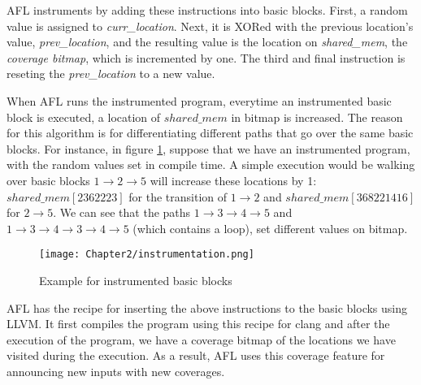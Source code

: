 AFL instruments by adding these instructions into basic blocks. First, a random value is assigned to \textit{curr\_location}. Next, it is XORed with the previous location's value, \textit{prev\_location}, and the resulting value is the location on \textit{shared\_mem}, the \textit{coverage bitmap}, which is incremented by one. The third and final instruction is reseting the \textit{prev\_location} to a new value.

When AFL runs the instrumented program, everytime an instrumented basic block is executed, a location of $shared\_mem$ in bitmap is increased. The reason for this algorithm is for differentiating different paths that go over the same basic blocks. For instance, in figure \ref{fig:instrumentation}, suppose that we have an instrumented program, with the random values set in compile time. A simple execution would be walking over basic blocks $1\rightarrow2\rightarrow5$ will increase these locations by 1: $shared\_mem[2362223]$ for the transition of $1\rightarrow2$ and $shared\_mem[368221416]$ for $2\rightarrow5$. We can see that the paths $1\rightarrow3\rightarrow4\rightarrow5$ and $1\rightarrow3\rightarrow4\rightarrow3\rightarrow4\rightarrow5$ (which contains a loop), set different values on bitmap.


\begin{figure}[htpb]
    \texttt{[image: Chapter2/instrumentation.png]}
    \centering
    \captionsetup{justification=centering}
    \caption{Example for instrumented basic blocks}
    \label{fig:instrumentation}
\end{figure}

AFL has the recipe for inserting the above instructions to the basic blocks using LLVM. It first compiles the program using this recipe for clang and after the execution of the program, we have a coverage bitmap of the locations we have visited during the execution. As a result, AFL uses this coverage feature for announcing new inputs with new coverages.
